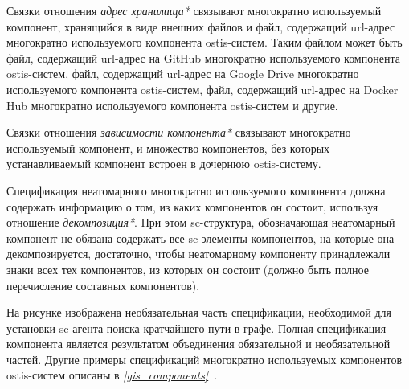 Связки отношения \textit{адрес хранилища*} связывают многократно используемый компонент, хранящийся в виде внешних файлов и файл, содержащий url-адрес многократно используемого компонента ostis-систем. Таким файлом может быть файл, содержащий url-адрес на GitHub многократно используемого компонента ostis-систем, файл, содержащий url-адрес на Google Drive многократно используемого компонента ostis-систем, файл, содержащий url-адрес на Docker Hub многократно используемого компонента ostis-систем и другие.

Связки отношения \textit{зависимости компонента*} связывают многократно используемый компонент, и множество компонентов, без которых устанавливаемый компонент  встроен в дочернюю ostis-систему.

Спецификация неатомарного многократно используемого компонента должна содержать информацию о том, из каких компонентов он состоит, используя отношение \textit{декомпозиция*}. При этом sc-структура, обозначающая неатомарный компонент не обязана содержать все sc-элементы компонентов, на которые она декомпозируется, достаточно, чтобы неатомарному компоненту принадлежали знаки всех тех компонентов, из которых он состоит (должно быть полное перечисление составных компонентов).

На рисунке  изображена необязательная часть спецификации, необходимой для установки sc-агента поиска кратчайшего пути в графе. Полная спецификация компонента является результатом объединения обязательной и необязательной частей. Другие примеры спецификаций многократно используемых компонентов ostis-систем описаны в \textit{\ref{gis_components}~}.

